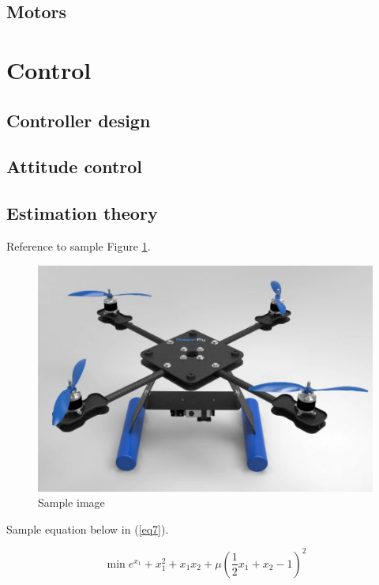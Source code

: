 \documentclass[a4paper]{article}
\begin{document}
	\subsection{Motors}

\section{Control}

	\subsection{Controller design}

	\subsection{Attitude control}

	\subsection{Estimation theory}

Reference to sample Figure \ref{fig:sampleimage}.

\begin{figure}[h]
    \centering
    \includegraphics[scale=0.4]{images/quad_rendered.jpg}
    \caption{Sample image}
    \label{fig:sampleimage}
\end{figure}

Sample equation below in (\ref{eq7}).

\begin{equation}
\min e^{x_1} + x_{1}^2 + x_{1}x_{2} + \mu (\dfrac{1}{2}x_1 + x_2 - 1)^2
\label{eq7}
\end{equation}
\end{document}
